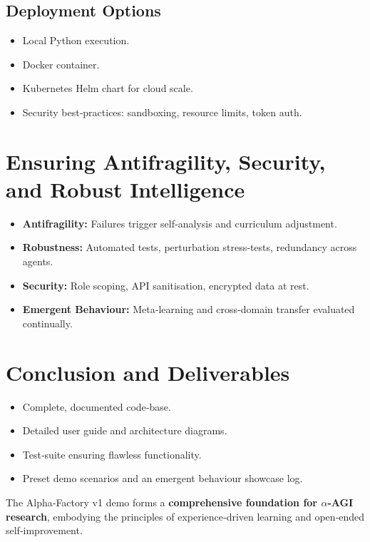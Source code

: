 \documentclass{article}
\begin{document}
\subsection*{Deployment Options}

\begin{itemize}[leftmargin=*]
  \item Local Python execution.
  \item Docker container.
  \item Kubernetes Helm chart for cloud scale.
  \item Security best‑practices: sandboxing, resource limits, token auth.
\end{itemize}

\section*{Ensuring Antifragility, Security, and Robust Intelligence}

\begin{itemize}[leftmargin=*]
  \item \textbf{Antifragility:} Failures trigger self‑analysis and curriculum adjustment.
  \item \textbf{Robustness:} Automated tests, perturbation stress‑tests, redundancy across agents.
  \item \textbf{Security:} Role scoping, API sanitisation, encrypted data at rest.
  \item \textbf{Emergent Behaviour:} Meta‑learning and cross‑domain transfer evaluated continually.
\end{itemize}

\section*{Conclusion and Deliverables}

\begin{itemize}[leftmargin=*]
  \item Complete, documented code‑base.
  \item Detailed user guide and architecture diagrams.
  \item Test‑suite ensuring flawless functionality.
  \item Preset demo scenarios and an emergent behaviour showcase log.
\end{itemize}

The Alpha‑Factory v1 demo forms a \textbf{comprehensive foundation for $\alpha$‑AGI research}, embodying the principles of experience‑driven learning and open‑ended self‑improvement.
\end{document}

